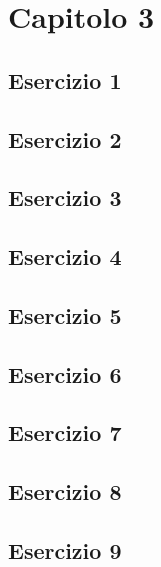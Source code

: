\section{\textbf{Capitolo 3}}
\subsection{Esercizio 1}

\subsection{Esercizio 2}

\subsection{Esercizio 3}

\subsection{Esercizio 4}

\subsection{Esercizio 5}

\subsection{Esercizio 6}

\subsection{Esercizio 7}

\subsection{Esercizio 8}

\subsection{Esercizio 9}

